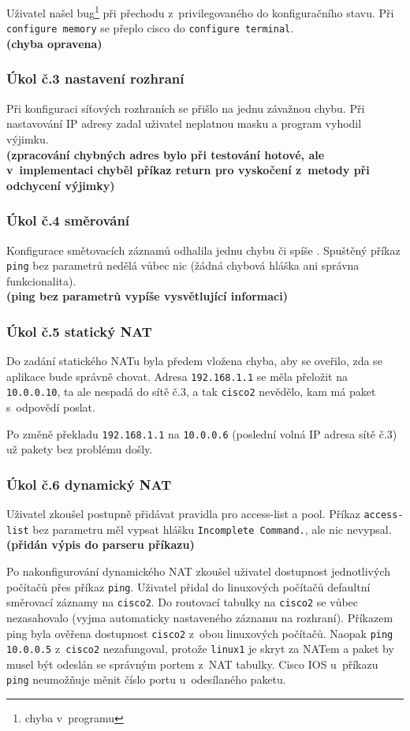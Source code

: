 Uživatel našel bug\footnote{chyba v~programu} při přechodu z~privilegovaného do konfiguračního stavu. Při \verb|configure memory| se přeplo cisco do \verb|configure terminal|.
\\\textbf{(chyba opravena)}

\subsubsection{Úkol č.3 nastavení rozhraní}
Při konfiguraci síťových rozhraních se přišlo na jednu závažnou chybu. Při nastavování IP adresy zadal uživatel neplatnou masku a program vyhodil výjimku.
\\\textbf{(zpracování chybných adres bylo při testování hotové, ale v~implementaci chyběl příkaz return pro vyskočení z~metody při odchycení výjimky)}

\subsubsection{Úkol č.4 směrování}
Konfigurace smětovacích záznamů odhalila jednu chybu či spíše . Spuštěný příkaz \verb|ping| bez parametrů nedělá vůbec nic (žádná chybová hláška ani správna funkcionalita).
\\\textbf{(ping bez parametrů vypíše vysvětlující informaci)}

\subsubsection{Úkol č.5 statický NAT}
Do zadání statického NATu byla předem vložena chyba, aby se oveřilo, zda se aplikace bude správně chovat. Adresa \verb|192.168.1.1| se měla přeložit na \verb|10.0.0.10|, ta ale nespadá do sítě č.3, a tak \verb|cisco2| nevědělo, kam má paket s~odpovědí poslat.

Po změně překladu \verb|192.168.1.1| na \verb|10.0.0.6| (poslední volná IP adresa sítě č.3) už pakety bez problému došly.

\subsubsection{Úkol č.6 dynamický NAT}
Uživatel zkoušel postupně přidávat pravidla pro access-list a pool. Příkaz \verb|access-list| bez parametru měl vypsat hlášku \verb|Incomplete Command.|, ale nic nevypsal.
\\\textbf{(přidán výpis do parseru příkazu)}

Po nakonfigurování dynamického NAT zkoušel uživatel dostupnost jednotlivých počítačů přes příkaz \verb|ping|. Uživatel přidal do linuxových počítačů defaultní směrovací záznamy na \verb|cisco2|. Do routovací tabulky na \verb|cisco2| se vůbec nezasahovalo (vyjma automaticky nastaveného záznamu na rozhraní). Příkazem ping byla ověřena dostupnost \verb|cisco2| z~obou linuxových počítačů. Naopak \verb|ping 10.0.0.5| z~\verb|cisco2| nezafungoval, protože \verb|linux1| je skryt za NATem a paket by musel být odeslán se správným portem z~NAT tabulky. Cisco IOS u~příkazu \verb|ping| neumožňuje měnit číslo portu u~odesílaného paketu.


